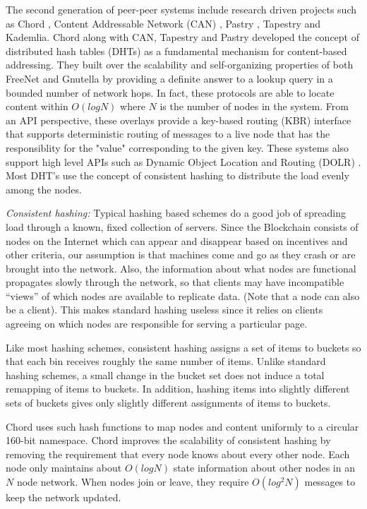 The second generation of peer-peer systems include research driven projects such as Chord \cite{Stoica_2001}, Content
Addressable Network (CAN)
\cite{Ratnasamy_2001}, Pastry \cite{Rowstron_2001}, Tapestry \cite{tapestry2004} and
Kademlia. Chord along with CAN, Tapestry and Pastry developed the concept of distributed hash tables (DHTs) as a
fundamental mechanism for content-based addressing. They built over the scalability and self-organizing properties of
both FreeNet and Gnutella by providing a definite answer to a lookup query in a bounded number of network hops. In fact,
these protocols are able to locate content within \( O(log N) \) where \(N\) is the number of nodes in the system. From
an 
API perspective, these overlays provide a key-based routing (KBR) interface that supports deterministic routing of
messages to a live node that has the responsiblity for the "value" corresponding to the given key. These systems also
support high level APIs such as Dynamic Object Location and Routing (DOLR) \cite{dolr2003}. Most DHT's use the concept
of consistent hashing to distribute the load evenly among the nodes.

{\em Consistent hashing:}
Typical hashing based schemes do a good job of spreading load through a known, fixed collection of servers. Since the
Blockchain consists of nodes on the Internet which can appear and disappear based on incentives and other criteria, our
assumption is that machines come and go as they crash or are brought into the network. Also,
the information about what nodes are functional propagates slowly through the
network, so that clients may have incompatible “views” of which nodes are available to replicate data. (Note that a
node can also be a client). This makes standard hashing useless since it relies on clients agreeing on which nodes are responsible for serving a particular
page.

Like most hashing schemes, consistent hashing assigns a set of items to buckets so that
each bin receives roughly the same number of items.  Unlike standard hashing schemes, a small change in the bucket set
does not induce a total remapping of items to buckets. In addition, hashing items into slightly different sets of
buckets gives only slightly different assignments of items to buckets. 

Chord uses such hash functions to map nodes and content uniformly to a circular 160-bit
namespace. Chord improves the scalability of consistent hashing by removing the requirement that every node knows about
every other node. Each node only maintains about \(O (log N) \) state information about other nodes in an \( N \) node
network. When nodes join or leave, they require \( O(log^2 N) \) messages to keep the network updated.

